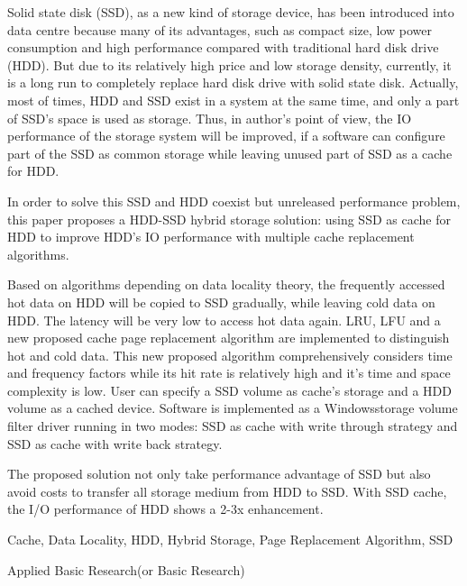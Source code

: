 \begin{eabstract}

Solid state disk (SSD), as a new kind of storage device, has been introduced into data centre because many of its advantages, such as compact size, low power consumption and high performance compared with traditional hard disk drive (HDD). But due to its relatively high price and low storage density, currently, it is a long run to completely replace hard disk drive with solid state disk. Actually, most of times, HDD and SSD exist in a system at the same time, and only a part of SSD's space is used as storage. Thus, in author's point of view, the IO performance of the storage system will be improved, if a software can configure part of the SSD as common storage while leaving unused part of SSD as a cache for HDD.

In order to solve this SSD and HDD coexist but unreleased performance problem, this paper proposes a HDD-SSD hybrid storage solution: using SSD as cache for HDD to improve HDD's IO performance with multiple cache replacement algorithms.

Based on algorithms depending on data locality theory, the frequently accessed hot data on HDD will be copied to SSD gradually, while leaving cold data on HDD. The latency will be very low to access hot data again. LRU, LFU and a new proposed cache page replacement algorithm are implemented to distinguish hot and cold data. This new proposed algorithm comprehensively considers time and frequency factors while its hit rate is relatively high and it's time and space complexity is low. User can specify a SSD volume as cache's storage and a HDD volume as a cached device. Software is implemented as a Windows\textregistered storage volume filter driver running in two modes: SSD as cache with write through strategy and SSD as cache with write back strategy.

The proposed solution not only take performance advantage of SSD but also avoid costs to transfer all storage medium from HDD to SSD. With SSD cache, the I/O performance of HDD shows a 2-3x enhancement.

\end{eabstract}

\begin{ekeywords}
Cache, Data Locality, HDD, Hybrid Storage, Page Replacement Algorithm, SSD
\end{ekeywords}

\begin{ethesistype}
Applied Basic Research(or Basic Research)
\end{ethesistype}

